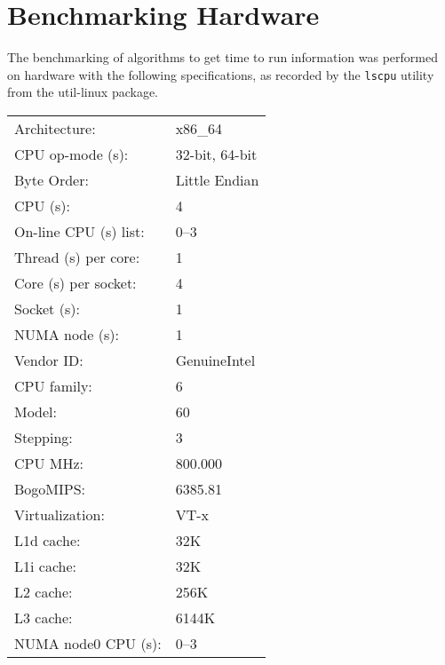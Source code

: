 
\section{Benchmarking Hardware}
\label{sec:benchmarking_hardware}

The benchmarking of algorithms to get time to run information was performed on
hardware with the following specifications, as recorded by the \texttt{lscpu}
utility from the util-linux package\cite{lscpu}.

\begin{tabular}{l l}
	Architecture:          & x86\_64 \\
	CPU op-mode  (s):      & 32-bit, 64-bit \\
	Byte Order:            & Little Endian \\
	CPU (s):               & 4 \\
	On-line CPU (s) list:  & 0--3 \\
	Thread (s) per core:   & 1 \\
	Core (s) per socket:   & 4 \\
	Socket (s):            & 1 \\
	NUMA node (s):         & 1 \\
	Vendor ID\@:           & GenuineIntel \\
	CPU family:            & 6 \\
	Model:                 & 60 \\
	Stepping:              & 3 \\
	CPU MHz:               & 800.000 \\
	BogoMIPS\@:            & 6385.81 \\
	Virtualization:        & VT-x \\
	L1d cache:             & 32K \\
	L1i cache:             & 32K \\
	L2 cache:              & 256K \\
	L3 cache:              & 6144K \\
	NUMA node0 CPU (s):    & 0--3 \\
\end{tabular}
